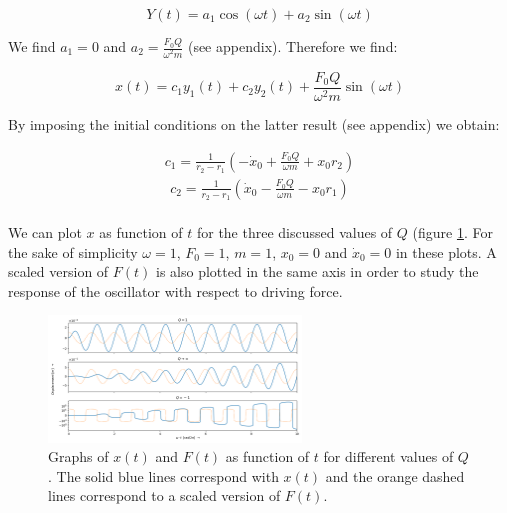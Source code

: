 \begin{equation*}
	Y(t) = a_1 \cos(\omega t) + a_2 \sin(\omega t)
\end{equation*}

We find $a_1 = 0$ and $a_2 = \frac{F_0 Q}{\omega^2 m}$ (see appendix). Therefore we find:

\begin{equation*}
	x(t) = c_1 y_1(t) + c_2 y_2(t) + \frac{F_0 Q}{\omega^2 m}\sin(\omega t)
\end{equation*}

By imposing the initial conditions on the latter result (see appendix) we obtain:

\begin{align*}
	c_1 = \frac{1}{r_2-r_1} \left( -\dot{x}_0 + \frac{F_0 Q}{\omega m} + x_0 r_2 \right)
\end{align*}
\begin{align*}
	c_2 = \frac{1}{r_2-r_1} \left( \dot{x}_0 - \frac{F_0 Q}{\omega m} - x_0 r_1 \right) \\
\end{align*}

We can plot $x$ as function of $t$ for the three discussed values of $Q$ (figure \ref{fig_q1}. For the sake of simplicity $\omega = 1$, $F_0 = 1$, $m = 1$, $x_0 = 0$ and $\dot{x}_0 = 0$ in these plots. A scaled version of $F(t)$ is also plotted in the same axis in order to study the response of the oscillator with respect to driving force.
\clearpage

\begin{figure}[h!]
	\centering
	\includegraphics[width=0.6\textwidth]{figures/graph_q1.png}
	\caption{Graphs of $x(t)$ and $F(t)$  as function of $t$ for different values of $Q$. The solid blue lines correspond with $x(t)$ and the orange dashed lines correspond to a scaled version of $F(t)$.}
	\label{fig_q1}
\end{figure}

